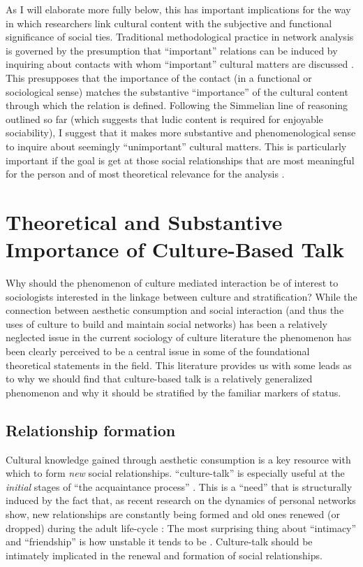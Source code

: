 \documentclass[11pt]{article}
\begin{document}
As I will elaborate more fully  below, this has important implications for the way in which researchers link cultural content with the subjective and functional significance of social ties.  Traditional methodological practice in network analysis is governed by the presumption that ``important'' relations can be induced by inquiring about contacts with whom ``important'' cultural matters are discussed \citep{burt84, marsden87}.   This presupposes that the importance of the contact (in a functional or sociological sense) matches the substantive ``importance'' of the cultural content through which the relation is defined. Following the Simmelian line of reasoning outlined so far (which suggests that ludic content is required for enjoyable sociability), I suggest that it makes more substantive and phenomenological sense to inquire about seemingly ``unimportant'' cultural matters.  This is particularly important if the goal is get at those social relationships that are most meaningful for the person and of most theoretical relevance for the analysis \citep{pachuki_breiger10, mische10}.

\section{Theoretical and Substantive Importance of Culture-Based Talk}  
Why should the phenomenon of culture mediated interaction be of interest to sociologists interested in the linkage between culture and stratification?  While the connection between aesthetic consumption and social interaction (and thus the uses of culture to build and maintain social networks) has been a relatively neglected issue in the current sociology of culture literature the phenomenon has been clearly perceived to be a central issue in some of the foundational theoretical statements in the field. This literature provides us with some leads as to why we should find that culture-based talk is a relatively generalized phenomenon and why it should be stratified by the familiar markers of status.  

\subsection{Relationship formation}
Cultural knowledge gained through aesthetic consumption is a key resource with which to form \emph{new} social relationships.  ``culture-talk'' is especially useful at the \emph{initial} stages of ``the acquaintance process'' \citep{newcomb61}.  This is a ``need'' that is structurally induced by the fact that, as recent research on the dynamics of personal networks show, new relationships are constantly being formed and old ones renewed (or dropped) during the adult life-cycle \citep{bidart_degenne05, burt00}:  The most surprising thing about ``intimacy'' and ``friendship'' is how unstable it tends to be \citep{wellman_etal97}. Culture-talk should be intimately implicated in the renewal and formation of social relationships.
\end{document}
